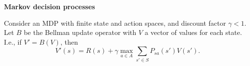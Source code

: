 \item {} {\bf Markov decision processes}


Consider an MDP with finite state and action spaces, and discount
factor $\gamma < 1$.  Let $B$ be the Bellman update operator with
$V$ a vector of values for each state. I.e., if $V' = B(V)$, then
\[
V'(s) = R(s) + \gamma \max_{a\in A} \sum_{s'\in S} P_{sa}(s')
V(s').
\]

\begin{enumerate}

\ifnum{} {
  
} \fi


\ifnum{} {
  
} \fi

\end{enumerate}

